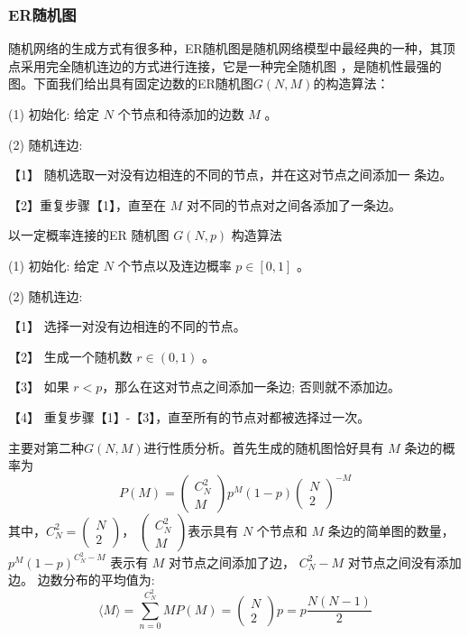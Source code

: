 \subsubsection*{ER随机图}
随机网络的生成方式有很多种，ER随机图是随机网络模型中最经典的一种，其顶点采用完全随机连边的方式进行连接，它是一种完全随机图
，是随机性最强的图。下面我们给出具有固定边数的ER随机图$G(N,M)$的构造算法：\par 
\noindent(1) 初始化: 给定 $N$ 个节点和待添加的边数 $M$ 。\par
\noindent(2) 随机连边:\par
【1】 随机选取一对没有边相连的不同的节点，并在这对节点之间添加一 条边。\par
【2】重复步骤【1】，直至在 $M$ 对不同的节点对之间各添加了一条边。\par
\noindent 以一定概率连接的ER 随机图 $G(N,p)$ 构造算法\par
\noindent(1) 初始化: 给定 $N$ 个节点以及连边概率 $p \in[0,1]$ 。\par
\noindent(2) 随机连边:\par
【1】 选择一对没有边相连的不同的节点。\par
【2】 生成一个随机数 $r \in(0,1)$ 。\par
【3】 如果 $r<p$，那么在这对节点之间添加一条边; 否则就不添加边。\par
【4】 重复步骤【1】-【3】，直至所有的节点对都被选择过一次。\par
主要对第二种$G(N,M)$进行性质分析。首先生成的随机图恰好具有 $M$ 条边的概率为
\begin{equation}
    P(M)=\left(\begin{array}{c}
    C^2_N \\
    M
    \end{array}\right) p^M(1-p)\left(\begin{array}{c}
    N \\
    2
    \end{array}\right)^{-M}
\end{equation}
其中，$C^2_N=\left(\begin{array}{c}
    N \\
    2
    \end{array}\right)$，
$\left(\begin{array}{c}
    C^2_N \\
    M
    \end{array}\right)$表示具有 $N$ 个节点和 $M$ 条边的简单图的数量，
    $p^M(1-p)^{C^2_N-M}$ 
表示有 $M$ 对节点之间添加了边， $C^2_N-M$ 对节点之间没有添加边。
边数分布的平均值为:
\begin{equation}
    \langle M\rangle=\sum_{n=0}^{C^2_N} M P(M)=\left(\begin{array}{l}
    N \\
    2
    \end{array}\right) p=p \frac{N(N-1)}{2}
    \end{equation}
